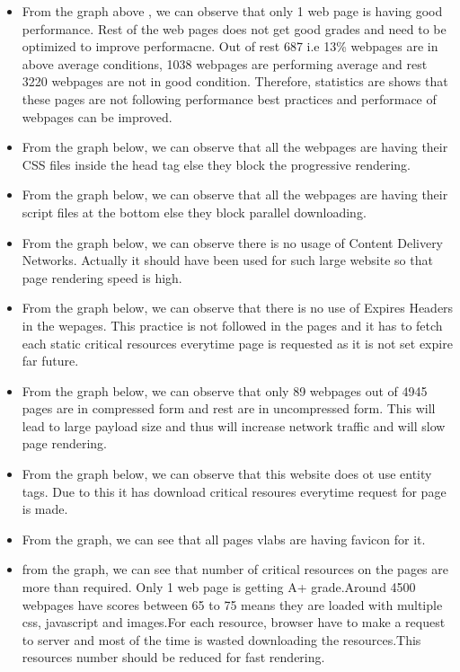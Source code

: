 \documentclass[a4paper,10pt]{IEEEtran}
\begin{document}
\begin{itemize}
\item From the graph above , we can observe that only 1 web page is having good
performance. Rest of the web pages does not get good grades and need to be
optimized to improve performacne. Out of rest 687 i.e 13\% webpages are in above average conditions, 1038
webpages are performing average and rest 3220 webpages are not in good
condition. Therefore, statistics are shows that these pages are not following
performance best practices and performace of webpages can be improved.  
 
\item From the graph below, we can observe that all the webpages are having their
CSS files inside the head tag else they block the progressive rendering.

\item From the graph below, we can observe that all the webpages are having their
script files at the bottom else they block parallel downloading.

\item From the graph below, we can observe there is no usage of Content Delivery
Networks. Actually it should have been used for such large website so that page
rendering speed is high.

\item From the graph below, we can observe that there is no use of Expires
Headers in the wepages. This practice is not followed in the pages and it has to
fetch each static critical resources everytime page is requested as it is not
set expire far future.

\item From the graph below, we can observe that only 89 webpages out of 4945
pages are in compressed form and rest are in uncompressed form. This will lead to
large payload size and thus will increase network traffic and will slow page
rendering.
\item From the graph below, we can observe that this website does ot use entity
tags. Due to this it has download critical resoures everytime request for page is
made.
\item From the graph, we can see that all pages vlabs are having favicon for it.
\item from the graph, we can see that number of critical resources  on the pages
are more than required. Only 1 web page is getting A+ grade.Around 4500 webpages
have scores between 65 to 75 means they are loaded with multiple css, javascript
and images.For each resource, browser have to make a request to server and most
of the time is wasted downloading the resources.This resources  number should be
reduced for fast rendering.
\end{itemize}
\end{document}
